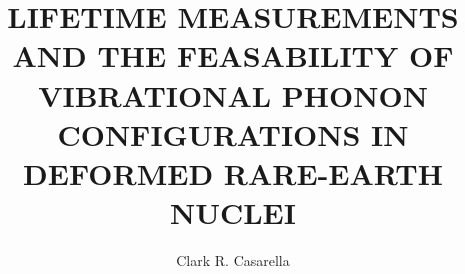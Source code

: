\documentclass[final,noinfo,sort&compress]{nddiss2e}
\begin{document}

\frontmatter         %

\title{LIFETIME MEASUREMENTS AND THE FEASABILITY OF VIBRATIONAL PHONON CONFIGURATIONS IN DEFORMED RARE-EARTH NUCLEI}
\author{Clark R. Casarella}           %

\maketitle           %

 \makepublicdomain   %
\end{document}

